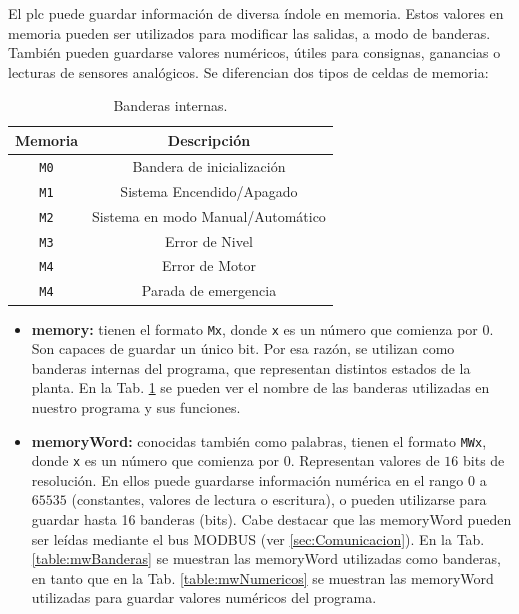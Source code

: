 El \gls{plc} puede guardar información de diversa índole en memoria.
Estos valores en memoria pueden ser utilizados para modificar las salidas, a
modo de banderas.
También pueden guardarse valores numéricos, útiles para consignas,
ganancias o lecturas de sensores analógicos.
Se diferencian dos tipos de celdas de memoria:

\begin{table}[ht]
\renewcommand{\arraystretch}{1.3}
\centering
\begin{tabular}{c||c}
\hline
\bfseries Memoria & \bfseries Descripción\\
\hline \hline
\verb|M0|  & Bandera de inicialización\\
\verb|M1|  & Sistema Encendido/Apagado\\
\verb|M2|  & Sistema en modo Manual/Automático\\
\verb|M3|  & Error de Nivel\\
\verb|M4|  & Error de Motor\\
\verb|M4|  & Parada de emergencia\\
\hline
\end{tabular}
\caption{Banderas internas.}
\label{table:Banderasinternas}
\end{table}

\begin{itemize}
 \item \textbf{\gls{memory}:} tienen el formato \verb|Mx|, donde \verb|x| es un
número que comienza por $0$.
Son capaces de guardar un único bit.
Por esa razón, se utilizan como banderas internas del programa, que representan
distintos estados de la planta.
En la Tab. \ref{table:Banderasinternas} se pueden ver el nombre
de las banderas utilizadas en nuestro programa y sus funciones.
 \item \textbf{\gls{memoryWord}:} conocidas también como palabras, tienen el
formato \verb|MWx|, donde \verb|x| es un número que comienza por $0$.
Representan valores de $16$ bits de resolución. En ellos puede guardarse
información numérica en el rango $0$ a $65535$
(constantes, valores de lectura o escritura), o pueden utilizarse para guardar
hasta 16 banderas (bits).
Cabe destacar que las \gls{memoryWord} pueden ser leídas mediante el bus MODBUS
(ver \ref{sec:Comunicacion}).
En la Tab. \ref{table:mwBanderas} se muestran las \gls{memoryWord}
utilizadas como banderas, en tanto que en la Tab.
\ref{table:mwNumericos}
se muestran las \gls{memoryWord} utilizadas para guardar valores numéricos del
programa.
\end{itemize}


